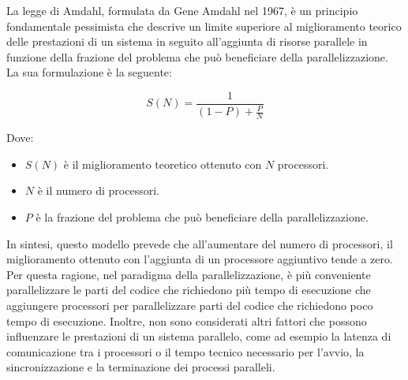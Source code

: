La legge di Amdahl, formulata da Gene Amdahl nel 1967, è un principio
fondamentale pessimista che descrive un limite superiore al miglioramento
teorico delle prestazioni di un sistema in seguito all'aggiunta di risorse
parallele in funzione della frazione del problema che può beneficiare della
parallelizzazione. La sua formulazione è la seguente:

\begin{equation}
  S(N) = \frac{1}{(1 - P) + \frac{P}{N}}
\end{equation}

Dove:
\begin{itemize}
  \item $S(N)$ è il miglioramento teoretico ottenuto con $N$ processori.

  \item $N$ è il numero di processori.

  \item $P$ è la frazione del problema che può beneficiare della parallelizzazione.
\end{itemize}

In sintesi, questo modello prevede che all'aumentare del numero di processori,
il miglioramento ottenuto con l'aggiunta di un processore aggiuntivo tende a
zero. Per questa ragione, nel paradigma della parallelizzazione, è più conveniente
parallelizzare le parti del codice che richiedono più tempo di esecuzione che aggiungere
processori per parallelizzare parti del codice che richiedono poco tempo di esecuzione.
Inoltre, non sono considerati altri fattori che possono influenzare le prestazioni
di un sistema parallelo, come ad esempio la latenza di comunicazione tra i
processori o il tempo tecnico necessario per l'avvio, la sincronizzazione e la terminazione
dei processi paralleli.